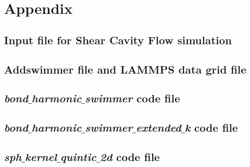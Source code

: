 \chapter{Appendix}
\label{sec:appendix}

\section{Input file for Shear Cavity Flow simulation}
\label{app:NURBSVolumenelement}




\section{Addswimmer file and LAMMPS data grid file}
\label{app:addswimmer}




\section{\textit{bond$\_$harmonic$\_$swimmer} code file}
\label{app:bond harmonic swimmer}



\section{\textit{bond$\_$harmonic$\_$swimmer$\_$extended$\_$k} code file}
\label{app:bond harmonic swimmer ext k}



\section{\textit{sph$\_$kernel$\_$quintic$\_$2d} code file}
\label{app:kernel function}

